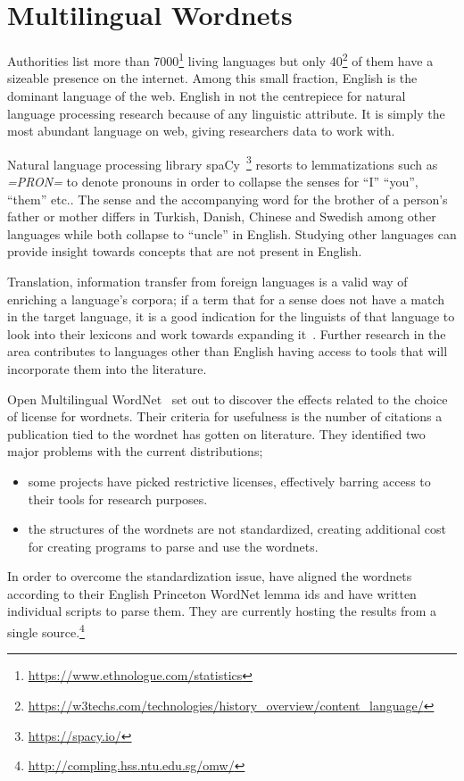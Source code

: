 \section{Multilingual Wordnets}%
\label{sec:multilingual_wordnets}
Authorities list more than 7000\footnote{\url{https://www.ethnologue.com/statistics}} living languages but only 40\footnote{\url{https://w3techs.com/technologies/history_overview/content_language/}} of them have a sizeable presence on the internet.
Among this small fraction, English is the dominant language of the web.
English in not the centrepiece for natural language processing research because of any linguistic attribute.
It is simply the most abundant language on web, giving researchers data to work with.

Natural language processing library spaCy~\footnote{\url{https://spacy.io/}} resorts to lemmatizations such as \emph{=PRON=} to denote pronouns in order to collapse the senses for \enquote{I} \enquote{you}, \enquote{them} etc.\@.
The sense and the accompanying word for the brother of a person's father or mother differs in Turkish, Danish, Chinese and Swedish among other languages while both collapse to \enquote{uncle} in English.
Studying other languages can provide insight towards concepts that are not present in English.

Translation, information transfer from foreign languages is a valid way of enriching a language's corpora; if a term that for a sense does not have a match in the target language, it is a good indication for the linguists of that language to look into their lexicons and work towards expanding it~\cite{ibrahim_usta_turkce_2006}.
Further research in the area contributes to languages other than English having access to tools that will incorporate them into the literature.

Open Multilingual WordNet~\cite{bond_survey_2012} set out to discover the effects related to the choice of license for wordnets.
Their criteria for usefulness is the number of citations a publication tied to the wordnet has gotten on literature.
They identified two major problems with the current distributions;
\begin{itemize}
    \item some projects have picked restrictive licenses, effectively barring access to their tools for research purposes.
    \item the structures of the wordnets are not standardized, creating additional cost for creating programs to parse and use the wordnets.
\end{itemize}
In order to overcome the standardization issue, \citeauthor{bond_survey_2012} have aligned the wordnets according to their English Princeton WordNet lemma ids and have written individual scripts to parse them.
They are currently hosting the results from a single source.\footnote{\url{http://compling.hss.ntu.edu.sg/omw/}}

